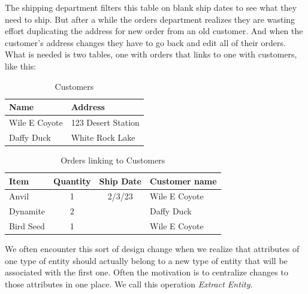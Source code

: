 \documentclass[english,submission]{programming}
\begin{document}
The shipping department filters this table on blank ship dates to see what they need to ship. But after a while the orders department realizes they are wasting effort duplicating the address for new order from an old customer. And when the customer's address changes they have to go back and edit all of their orders. What is needed is two tables, one with orders that links to one with customers, like this:

\begin{table}[h!]
  \centering
    \begin{tabular}{ |l|l|}
      \hline
      Name & Address \\
      \hline \hline
      Wile E Coyote & 123 Desert Station \\
      \hline
      Daffy Duck & White Rock Lake \\
      \hline
    \end{tabular}
  \caption{Customers}
\end{table}

\begin{table}[h!]
  \centering
    \begin{tabular}{ |l|c|c|l|}
     \hline
     Item & Quantity & Ship Date & Customer name \\
     \hline \hline
     Anvil & 1 & 2/3/23 & Wile E Coyote \\
     \hline
     Dynamite & 2 & & Daffy Duck  \\
     \hline
     Bird Seed & 1 & & Wile E Coyote \\
     \hline
    \end{tabular}
  \caption{Orders linking to Customers}
\end{table}

We often encounter this sort of design change when we realize that attributes of one type of entity should actually belong to a new type of entity that will be associated with the first one. Often the motivation is to centralize changes to those attributes in one place. We call this operation \textit{Extract Entity}.
\end{document}
